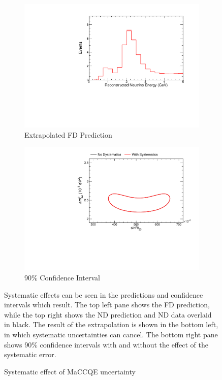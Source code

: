 {\begin{figure}
\begin{center}
\vspace{20pt}

\begin{subfigure}[c]{0.49\textwidth}
\includegraphics[width=\textwidth]{figures/systs/prediction/fd_extrap_prediction_MaCCQE.pdf}
\caption*{Extrapolated FD Prediction}
\end{subfigure}
\begin{subfigure}[c]{0.49\textwidth}
\includegraphics[width=\textwidth]{figures/systs/prediction/fd_extrap_contour_MaCCQE.pdf}
\caption*{90\% Confidence Interval}
\end{subfigure}
\end{center}
\caption{Systematic effect of MaCCQE uncertainty}{
Systematic effects can be seen in the predictions and confidence intervals
which result.
The top left pane shows the FD prediction, while the top right shows the
ND prediction and ND data overlaid in black.
The result of the extrapolation is shown in the bottom left, in which
systematic uncertainties can cancel.
The bottom right pane shows 90\% confidence intervals with and without
the effect of the systematic error.}
\label{syst_fig_MaCCQE}


\end{figure}}
